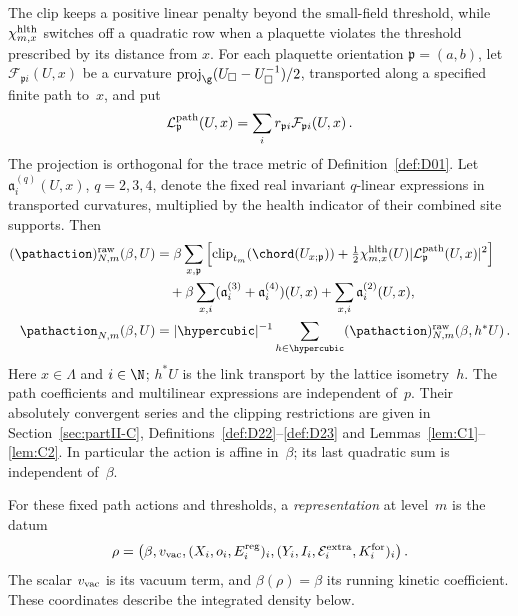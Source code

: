 The clip keeps a positive linear penalty beyond the small-field threshold, while $\chi^{\rm hlth}_{m,x}$ switches off a quadratic row when a plaquette violates the threshold prescribed by its distance from $x$. For each plaquette orientation $\mathfrak p=(a,b)$, let $\mathcal F_{\mathfrak p i}(U,x)$ be a curvature $\operatorname{proj}_{\g}(U_\square-U_\square^{-1})/2$, transported along a specified finite path to~$x$, and put
\begin{equation*}
\mathcal L_{\mathfrak p}^{\rm path}(U,x)=\sum_i r_{\mathfrak p i}\mathcal F_{\mathfrak p i}(U,x)\,.
\end{equation*}
The projection is orthogonal for the trace metric of Definition~\ref{def:D01}. Let $\mathfrak a_i^{(q)}(U,x)$, $q=2,3,4$, denote the fixed real invariant $q$-linear expressions in transported curvatures, multiplied by the health indicator of their combined site supports. Then
\begin{align}\label{eq:I12-path-action}
(\pathaction)^{\rm raw}_{N,m}(\beta,U)
&=\beta\sum_{x,\mathfrak p}\left[
\operatorname{clip}_{t_m}(\chord(U_{x;\mathfrak p}))
+\tfrac12\chi^{\rm hlth}_{m,x}(U)|\mathcal L_{\mathfrak p}^{\rm path}(U,x)|^2\right]\notag\\
&\quad+\beta\sum_{x,i}(\mathfrak a_i^{(3)}+\mathfrak a_i^{(4)})(U,x)
+\sum_{x,i}\mathfrak a_i^{(2)}(U,x),\\
\pathaction_{N,m}(\beta,U)
&=|\hypercubic|^{-1}\sum_{h\in\hypercubic}(\pathaction)^{\rm raw}_{N,m}(\beta,h^*U)\,.\notag
\end{align}
Here $x\in\Lambda$ and $i\in\N$; $h^*U$ is the link transport by the lattice isometry~$h$. The path coefficients and multilinear expressions are independent of~$p$. Their absolutely convergent series and the clipping restrictions are given in Section~\ref{sec:partII-C}, Definitions~\ref{def:D22}--\ref{def:D23} and Lemmas~\ref{lem:C1}--\ref{lem:C2}. In particular the action is affine in~$\beta$; its last quadratic sum is independent of~$\beta$.

For these fixed path actions and thresholds, a \emph{representation} at level~$m$ is the datum
\begin{equation}\label{eq:I12-representation}
\rho=\bigl(\beta,v_{\rm vac},(X_i,o_i,E_i^{\rm reg})_i,
(Y_i,I_i,\mathcal E_i^{\rm extra},K_i^{\rm for})_i\bigr)\,.
\end{equation}
The scalar $v_{\rm vac}$ is its vacuum term, and $\beta(\rho)=\beta$ its running kinetic coefficient. These coordinates describe the integrated density below.

